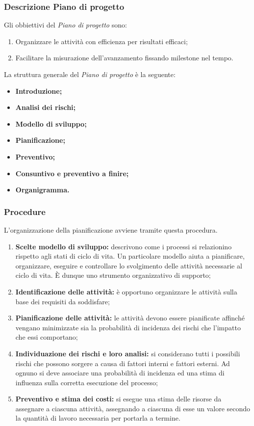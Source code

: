 \documentclass[11pt,a4paper]{article}
\begin{document}
\subsubsection{Descrizione Piano di progetto}

Gli obbiettivi del \textit{Piano di progetto} sono:

\begin{enumerate}
\item Organizzare le attività con efficienza per risultati efficaci;
\item Facilitare la misurazione dell'avanzamento fissando milestone nel tempo.
\end{enumerate}

La struttura generale del \textit{Piano di progetto} è la seguente:
\begin{itemize}
\item \textbf{Introduzione;}
\item \textbf{Analisi dei rischi;}
\item \textbf{Modello di sviluppo;}
\item \textbf{Pianificazione;}
\item \textbf{Preventivo;}
\item \textbf{Consuntivo e preventivo a finire;}
\item \textbf{Organigramma.}
\end{itemize}

\subsubsection{Procedure}

L’organizzazione della pianificazione avviene tramite questa procedura.

\begin{enumerate}
	\item \textbf{Scelte modello di sviluppo:} descrivono come i processi si relazionino rispetto agli stati di ciclo di vita. Un particolare modello aiuta a pianificare, organizzare, eseguire e controllare lo svolgimento delle attività necessarie al ciclo di vita. È dunque uno strumento organizzativo di supporto;
	\item \textbf{Identificazione delle attività:} è opportuno organizzare le attività sulla base dei requisiti da soddisfare;
	\item \textbf{Pianificazione delle attività:} le attività devono essere pianificate affinché vengano minimizzate sia la probabilità di incidenza dei rischi che l'impatto che essi comportano;
	\item \textbf{Individuazione dei rischi e loro analisi:} si considerano tutti i possibili rischi che possono sorgere a causa di fattori interni e fattori esterni. Ad ognuno si deve associare una probabilità di incidenza ed una stima di influenza sulla corretta esecuzione del processo;
	\item \textbf{Preventivo e stima dei costi:} si esegue una stima delle risorse da assegnare a ciascuna attività, assegnando a ciascuna di esse un valore secondo la quantità di lavoro necessaria per portarla a termine.
\end{enumerate}
\end{document}
